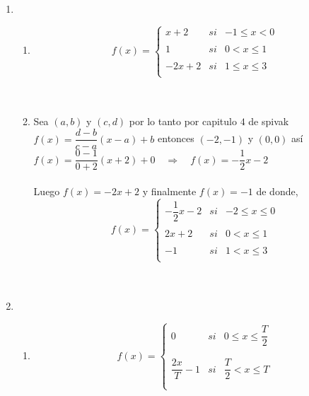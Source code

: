 \begin{enumerate}
\begin{enumerate}[\bfseries a.]
    \end{enumerate}

    \item 
    \begin{enumerate}[\bfseries a.]

	\item  
	$$f(x)= \left\{ \begin{array}{rcl}
		x+2&si& -1 \leq x < 0 \\
		\\ 1&si& 0 < x \leq 1 \\ 
		\\ -2x + 2&si&1 \leq x \leq 3\\
		\end{array}\right.$$\\\\
	
	\item Sea $(a,b)$ y $(c,d)$ por lo tanto por capitulo $4$ de spivak $f(x)=\dfrac{d-b}{c-a}(x-a)+b$ entonces $(-2,-1)$ y $(0,0)$ así $f(x)=\dfrac{0-1}{0+2}(x+2) + 0 \quad \Longrightarrow \quad f(x) = -\dfrac{1}{2}x - 2$ \\\\
	Luego $f(x)=-2x+2$ y finalmente $f(x)=-1$ de donde,
	$$f(x)= \left\{ \begin{array}{rcl}
		- \dfrac{1}{2}x -2&si& -2 \leq x \leq 0 \\
		\\ 2x+2&si& 0 < x \leq 1 \\ 
		\\ -1&si&1 < x \leq 3\\
		\end{array}\right.$$\\\\
    \end{enumerate}

    \item 
    \begin{enumerate}[\bfseries a.]

	\item 
	$$f(x)= \left\{ \begin{array}{rcl}
		0&si& 0 \leq x \leq \dfrac{T}{2} \\\\
		\\ \dfrac{2x}{T} - 1&si& \dfrac{T}{2}< x \leq T \\\\ 
		\end{array}\right.$$\\\\


\end{enumerate}
\end{enumerate}
